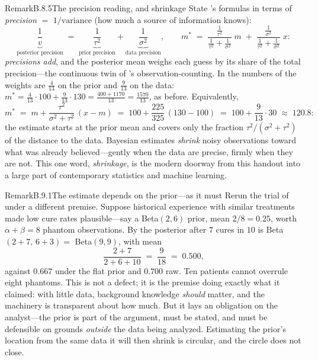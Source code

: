 \documentclass[main.tex]{subfiles}
\begin{document}
\begin{ObjL}{Remark}{B.8.5}{The precision reading, and shrinkage}
State 's formulas in terms of \emph{precision} $=$ $1/\text{variance}$ (how
much a source of information knows):
\[ \underbrace{\frac1v}_{\text{posterior precision}}
   \;=\; \underbrace{\frac{1}{\tau^2}}_{\text{prior precision}}
   + \underbrace{\frac{1}{\sigma^2}}_{\text{data precision}} ,
   \qquad
   m^{*} \;=\; \frac{\frac{1}{\tau^2}}{\frac{1}{\tau^2}+\frac{1}{\sigma^2}}\; m
   \;+\; \frac{\frac{1}{\sigma^2}}{\frac{1}{\tau^2}+\frac{1}{\sigma^2}}\; x : \]
\emph{precisions add}, and the posterior mean weighs each guess by its share of the total
precision---the continuous twin of 's observation-counting. In the numbers of
 the weights are $\frac{4}{13}$ on the prior and $\frac{9}{13}$ on the data:
$m^*=\frac{4}{13}\cdot100+\frac{9}{13}\cdot130=\frac{400+1170}{13}=\frac{1570}{13}$, as
before. Equivalently,
\[ m^{*} \;=\; m + \frac{\tau^2}{\sigma^2+\tau^2}\,(x - m)
   \;=\; 100 + \frac{225}{325}\,(130-100) \;=\; 100 + \frac{9}{13}\cdot30 \;\approx\;
   120.8 : \]
the estimate starts at the prior mean and covers only the fraction
$\tau^2/(\sigma^2+\tau^2)$ of the distance to the data. Bayesian estimates \emph{shrink}
noisy observations toward what was already believed---gently when the data are precise,
firmly when they are not. This one word, \emph{shrinkage}, is the modern doorway from this
handout into a large part of contemporary statistics and machine learning.
\end{ObjL}


\begin{ObjL}{Remark}{B.9.1}{The estimate depends on the prior---as it must}
Rerun the trial of  under a different premise. Suppose historical experience
with similar treatments made low cure rates plausible---say a Beta$(2,6)$ prior, mean
$2/8=0.25$, worth $\alpha+\beta=8$ phantom observations. By  the posterior
after $7$ cures in $10$ is Beta$(2+7,\,6+3)=$ Beta$(9,9)$, with mean
\[ \frac{2+7}{2+6+10} \;=\; \frac{9}{18} \;=\; 0.500 , \]
against $0.667$ under the flat prior and $0.700$ raw. Ten patients cannot overrule eight
phantoms. This is not a defect; it is the premise doing exactly what it claimed: with
little data, background knowledge \emph{should} matter, and the machinery is transparent
about how much. But it lays an obligation on the analyst---the prior is part of the
argument, must be stated, and must be defensible on grounds \emph{outside} the data being
analyzed. Estimating the prior's location from the same data it will then shrink is
circular, and the circle does not close.
\end{ObjL}
\end{document}
